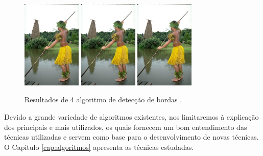 \begin{figure}[!htb]
 \centering
 \def\baselinestretch{1}\small\normalsize
 \includegraphics[width=0.25\textwidth]{img/101087.jpg}\qquad
 \includegraphics[width=0.25\textwidth]{img/101087.jpg}  \qquad
 \includegraphics[width=0.25\textwidth]{img/101087.jpg}        
 \caption{\label{fig:indio}Resultados de 4 algoritmo de detec\c{c}\~{a}o de bordas \citep{berkeley}.}
\end{figure}



Devido a  grande variedade de algoritmos existentes, nos limitaremos à explicação dos principais e mais utilizados, os quais fornecem um bom entendimento das técnicas utilizadas e servem como base para o desenvolvimento de novas técnicas. O Capitulo \ref{cap:algoritmos} apresenta as técnicas estudadas.



